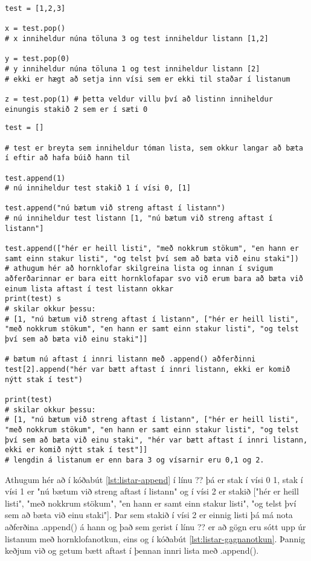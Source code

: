 \begin{lstlisting}[caption=.pop() aðferðin, label=lst:listar-pop]
test = [1,2,3]

x = test.pop()
# x inniheldur núna töluna 3 og test inniheldur listann [1,2]

y = test.pop(0)
# y inniheldur núna töluna 1 og test inniheldur listann [2]
# ekki er hægt að setja inn vísi sem er ekki til staðar í listanum

z = test.pop(1) # þetta veldur villu því að listinn inniheldur einungis stakið 2 sem er í sæti 0
\end{lstlisting}
\begin{lstlisting}[caption=.append() aðferðin, label=lst:listar-append]
test = []

# test er breyta sem inniheldur tóman lista, sem okkur langar að bæta í eftir að hafa búið hann til

test.append(1)
# nú inniheldur test stakið 1 í vísi 0, [1]

test.append("nú bætum við streng aftast í listann")
# nú inniheldur test listann [1, "nú bætum við streng aftast í listann"]

test.append(["hér er heill listi", "með nokkrum stökum", "en hann er samt einn stakur listi", "og telst því sem að bæta við einu staki"])
# athugum hér að hornklofar skilgreina lista og innan í svigum aðferðarinnar er bara eitt hornklofapar svo við erum bara að bæta við einum lista aftast í test listann okkar
print(test) s
# skilar okkur þessu:
# [1, "nú bætum við streng aftast í listann", ["hér er heill listi", "með nokkrum stökum", "en hann er samt einn stakur listi", "og telst því sem að bæta við einu staki"]]

# bætum nú aftast í innri listann með .append() aðferðinni
test[2].append("hér var bætt aftast í innri listann, ekki er komið nýtt stak í test")

print(test)
# skilar okkur þessu:
# [1, "nú bætum við streng aftast í listann", ["hér er heill listi", "með nokkrum stökum", "en hann er samt einn stakur listi", "og telst því sem að bæta við einu staki", "hér var bætt aftast í innri listann, ekki er komið nýtt stak í test"]]
# lengdin á listanum er enn bara 3 og vísarnir eru 0,1 og 2.

\end{lstlisting}
Athugum hér að í kóðabút \ref{lst:listar-append} í línu ?? þá er stak í vísi 0 1, stak í vísi 1 er "nú bætum við streng aftast í listann" og í vísi 2 er stakið ["hér er heill listi", "með nokkrum stökum", "en hann er samt einn stakur listi", "og telst því sem að bæta við einu staki"].
Þar sem stakið í vísi 2 er einnig listi þá má nota aðferðina .append() á hann og það sem gerist í línu ?? er að gögn eru sótt upp úr listanum með hornklofanotkun, eins og í kóðabút \ref{lst:listar-gagnanotkun}.
Þannig keðjum við og getum bætt aftast í þennan innri lista með .append().

